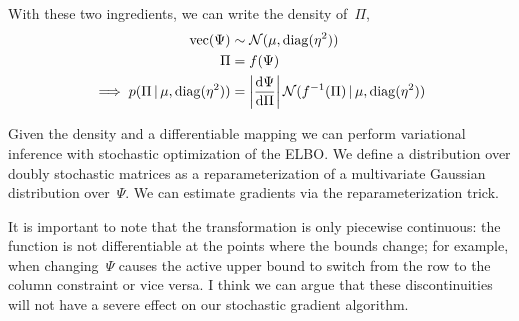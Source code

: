 With these two ingredients, we can write the density of~${\Pi}$,
\begin{align}
  \text{vec} (\Psi) &\sim \mathcal{N}(\mu, \operatorname{diag}(\eta^2))
  \\
  {\Pi} &= f(\Psi) \\
  \implies
  p(\Pi \, | \, \mu, \operatorname{diag}(\eta^2)) &= \left|\frac{\mathrm{d} \Psi }{\mathrm{d} {\Pi}} \right|
  \mathcal{N}(f^{-1}({\Pi}) \, | \, \mu, \operatorname{diag}(\eta^2))
\end{align}

Given the density and a differentiable mapping we can perform
variational inference with stochastic optimization of the ELBO.
We define a distribution over doubly stochastic matrices as a
reparameterization of a multivariate Gaussian distribution
over~$\Psi$. We can estimate gradients via the reparameterization
trick.

It is important to note that the transformation is only piecewise
continuous: the function is not differentiable at the points where
the bounds change; for example, when changing~$\Psi$ causes the
active upper bound to switch from the row to the column constraint
or vice versa.  I think we can argue that these discontinuities
will not have a severe effect on our stochastic gradient algorithm.




